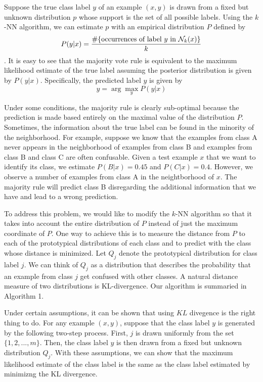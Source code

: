 \documentclass{article}
\begin{document}
Suppose the true class label $y$ of an example $(x,y)$ is drawn from a fixed
but unknown distribution $p$ whose support is the set of all possible
labels. Using the $k$-NN algorithm, we can estimate $p$ with an
empirical distribution $P$ defined by
\[
P(y|x) = \frac{\#\{ \mbox{occurrences of label } y \mbox{ in } \mathcal{N}_k(x)\}}{k}
\]. 
It is easy to see that the majority vote rule is equivalent to the
maximum likelihood estimate of the true label assuming the posterior
distribution is given by $P(y|x)$. Specifically, the predicted label
$\hat{y}$ is given by
\[
\hat{y} = \arg\max_y P(y|x)
\]

Under some conditions, the majority rule is clearly sub-optimal
because the prediction is made based entirely on the maximal value of
the distribution $P$. Sometimes, the information about the
true label can be found in the minority of the neighborhood. For
example, suppose we know that the examples from class A never appears
in the neighborhood of examples from class B and examples from class B
and class C are often confusable. Given a test example $x$ that we
want to identify its class, we estimate $P(B | x) = 0.45$ and $P(C |
x) = 0.4$. However, we observe a number of examples from class A in
the neightborhood of $x$. The majority rule will predict class B
disregarding the additional information that we have and lead to a
wrong prediction.

To address this problem, we would like to modify the $k$-NN algorithm
so that it takes into account the entire distribution of $P$ instead
of just the maximum coordinate of $P$. One way to achieve this is to
measure the distance from $P$ to each of the prototypical
distributions of each class and to predict with the class whose
distance is minimized. Let $Q_j$ denote the prototypical distribution
for class label $j$. We can think of $Q_j$ as a distribution that
describes the probability that an example from class $j$ get confused
with other classes. A natural distance measure of two distributions is
KL-divergence. Our algorithm is summaried in Algorithm 1.

Under certain assumptions, it can be shown that using $KL$ divegence
is the right thing to do. For any example $(x,y)$, suppose that the class label $y$ is
generated by the following two-step process. First, $j$ is drawn
uniformly from the set $\{1,2,...,m\}$. Then, the class label $y$ is
then drawn from a fixed but unknown distribution $Q_j$. With these
assumptions, we can show that the maximum likelihood estimate of the class
label is the same as the class label estimated by minimizng the KL
divergence.
  
\end{document}

